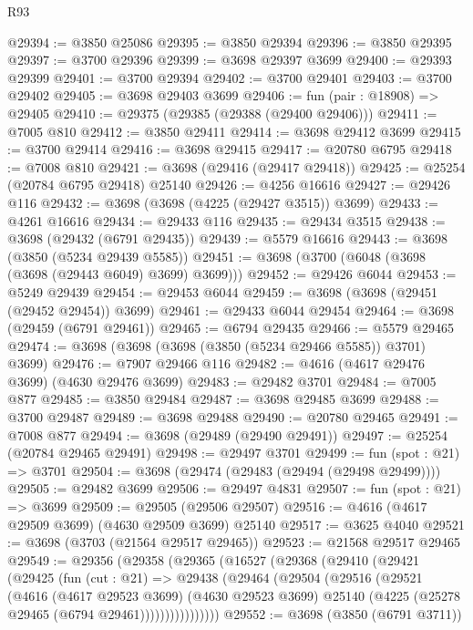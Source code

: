 \begin{lexlean}{R93}
\begin{coremodule}
@29394 := @3850 @25086
@29395 := @3850 @29394
@29396 := @3850 @29395
@29397 := @3700 @29396
@29399 := @3698 @29397 @3699
@29400 := @29393 @29399
@29401 := @3700 @29394
@29402 := @3700 @29401
@29403 := @3700 @29402
@29405 := @3698 @29403 @3699
@29406 := fun (pair : @18908) => @29405
@29410 := @29375 (@29385 (@29388 (@29400 @29406)))
@29411 := @7005 @810
@29412 := @3850 @29411
@29414 := @3698 @29412 @3699
@29415 := @3700 @29414
@29416 := @3698 @29415
@29417 := @20780 @6795
@29418 := @7008 @810
@29421 := @3698 (@29416 (@29417 @29418))
@29425 := @25254 (@20784 @6795 @29418) @25140
@29426 := @4256 @16616
@29427 := @29426 @116
@29432 := @3698 (@3698 (@4225 (@29427 @3515)) @3699)
@29433 := @4261 @16616
@29434 := @29433 @116
@29435 := @29434 @3515
@29438 := @3698 (@29432 (@6791 @29435))
@29439 := @5579 @16616
@29443 := @3698 (@3850 (@5234 @29439 @5585))
@29451 := @3698 (@3700 (@6048 (@3698 (@3698 (@29443 @6049) @3699) @3699)))
@29452 := @29426 @6044
@29453 := @5249 @29439
@29454 := @29453 @6044
@29459 := @3698 (@3698 (@29451 (@29452 @29454)) @3699)
@29461 := @29433 @6044 @29454
@29464 := @3698 (@29459 (@6791 @29461))
@29465 := @6794 @29435
@29466 := @5579 @29465
@29474 := @3698 (@3698 (@3698 (@3850 (@5234 @29466 @5585)) @3701) @3699)
@29476 := @7907 @29466 @116
@29482 := @4616 (@4617 @29476 @3699) (@4630 @29476 @3699)
@29483 := @29482 @3701
@29484 := @7005 @877
@29485 := @3850 @29484
@29487 := @3698 @29485 @3699
@29488 := @3700 @29487
@29489 := @3698 @29488
@29490 := @20780 @29465
@29491 := @7008 @877
@29494 := @3698 (@29489 (@29490 @29491))
@29497 := @25254 (@20784 @29465 @29491)
@29498 := @29497 @3701
@29499 := fun (spot : @21) => @3701
@29504 := @3698 (@29474 (@29483 (@29494 (@29498 @29499))))
@29505 := @29482 @3699
@29506 := @29497 @4831
@29507 := fun (spot : @21) => @3699
@29509 := @29505 (@29506 @29507)
@29516 := @4616 (@4617 @29509 @3699) (@4630 @29509 @3699) @25140
@29517 := @3625 @4040
@29521 := @3698 (@3703 (@21564 @29517 @29465))
@29523 := @21568 @29517 @29465
@29549 := @29356
    (@29358
      (@29365
        (@16527
          (@29368
            (@29410
              (@29421
                (@29425
                  (fun (cut : @21) =>
                  @29438
                    (@29464
                      (@29504
                        (@29516
                          (@29521
                            (@4616
                              (@4617 @29523 @3699)
                              (@4630 @29523 @3699)
                              @25140
                              (@4225 (@25278 @29465 (@6794 @29461))))))))))))))))
@29552 := @3698 (@3850 (@6791 @3711))

\end{coremodule}
\end{lexlean}
